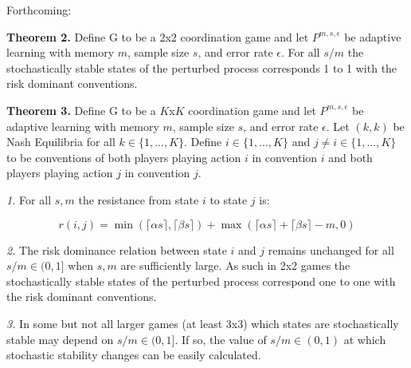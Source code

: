 \documentclass{article}
\begin{document}
\pagebreak

Forthcoming:

\textbf{Theorem 2.} Define G to be a 2x2 coordination game and let $P^{m,s,\epsilon}$ be adaptive learning with memory $m$, sample size $s$, and error rate $\epsilon$. For all $s/m$ the stochastically stable states of the perturbed process corresponds 1 to 1 with the risk dominant conventions.

\vskip12pt

\textbf{Theorem 3.} Define G to be a $K$x$K$ coordination game and let $P^{m,s,\epsilon}$ be adaptive learning with memory $m$, sample size $s$, and error rate $\epsilon$. Let $(k,k)$ be Nash Equilibria for all $k \in \{1,...,K\}$. Define $i \in \{1,...,K\}$ and $j \neq i \in \{1,...,K\}$ to be conventions of both players playing action $i$ in convention $i$ and both players playing action $j$ in convention $j$.

\textit{1.} For all $s, m$ the resistance from state $i$ to state $j$ is:

$$r(i,j)=\min(\lceil \alpha s \rceil,\lceil \beta s \rceil)+\max(\lceil \alpha s \rceil+\lceil \beta s \rceil-m,0)$$

\textit{2.} The risk dominance relation between state $i$ and $j$ remains unchanged for all $s/m \in (0,1]$ when $s,m$ are sufficiently large. As such in 2x2 games the stochastically stable states of the perturbed process correspond one to one with the risk dominant conventions.

\textit{3.} In some but not all larger games (at least 3x3) which states are stochastically stable may depend on $s/m \in (0,1]$. If so, the value of $s/m \in (0,1)$ at which stochastic stability changes can be easily calculated.




\end{document}
